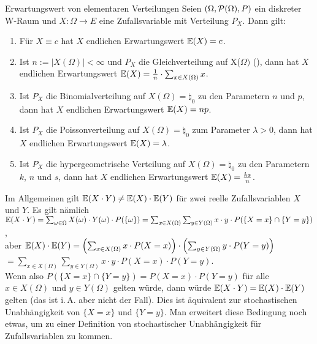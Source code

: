 \linie
\pagebreak

\begin{Satz}{Erwartungswert von elementaren Verteilungen}
    Seien $(\Omega, \P(\Omega), P)$ ein diskreter\\
    W-Raum und $X\colon \Omega \rightarrow E$ eine Zufallsvariable mit Verteilung $P_X$.
    Dann gilt:
    \begin{enumerate}
        \item
        Für $X \equiv c$ hat $X$ endlichen Erwartungswert $\EW(X) = c$.
        
        \item
        Ist $n := |X(\Omega)| < \infty$ und $P_X$ die Gleichverteilung auf X($\Omega)$
        (), dann hat $X$ endlichen Erwartungswert
        $\EW(X) = \frac{1}{n} \cdot \sum_{x \in X(\Omega)} x$.
        
        \item
        Ist $P_X$ die Binomialverteilung auf $X(\Omega) = \natural_0$
        zu den Parametern $n$ und $p$, dann hat $X$ endlichen Erwartungswert $\EW(X) = np$.
        
        \item
        Ist $P_X$ die Poissonverteilung auf $X(\Omega) = \natural_0$ zum Parameter $\lambda > 0$,
        dann hat $X$ endlichen Erwartungswert $\EW(X) = \lambda$.
        
        \item
        Ist $P_X$ die hypergeometrische Verteilung auf $X(\Omega) = \natural_0$ zu den Parametern
        $k$, $n$ und $s$, dann hat $X$ endlichen Erwartungswert $\EW(X) = \frac{ks}{n}$.
    \end{enumerate}
\end{Satz}

\linie

\begin{Bem}
    Im Allgemeinen gilt $\EW(X \cdot Y) \not= \EW(X) \cdot \EW(Y)$ für zwei reelle Zufallsvariablen
    $X$ und $Y$.
    Es gilt nämlich\\
    $\EW(X \cdot Y) =
    \sum_{\omega \in \Omega} X(\omega) \cdot Y(\omega) \cdot P(\{\omega\}) =
    \sum_{x \in X(\Omega)} \sum_{y \in Y(\Omega)} x \cdot y \cdot P(\{X = x\} \cap \{Y = y\})$,\\
    aber $\EW(X) \cdot \EW(Y) = \left(\sum_{x \in X(\Omega)} x \cdot P(X = x)\right) \cdot
    \left(\sum_{y \in Y(\Omega)} y \cdot P(Y = y)\right)$\\
    $= \sum_{x \in X(\Omega)} \sum_{y \in Y(\Omega)} x \cdot y \cdot P(X = x) \cdot P(Y = y)$.\\
    Wenn also $P(\{X = x\} \cap \{Y = y\}) = P(X = x) \cdot P(Y = y)$ für alle $x \in X(\Omega)$
    und $y \in Y(\Omega)$ gelten würde, dann würde $\EW(X \cdot Y) = \EW(X) \cdot \EW(Y)$ gelten
    (das ist i.\,A. aber nicht der Fall).
    Dies ist äquivalent zur stochastischen Unabhängigkeit von $\{X = x\}$ und $\{Y = y\}$.
    Man erweitert diese Bedingung noch etwas, um zu einer Definition von stochastischer
    Unabhängigkeit für Zufallsvariablen zu kommen.
\end{Bem}

